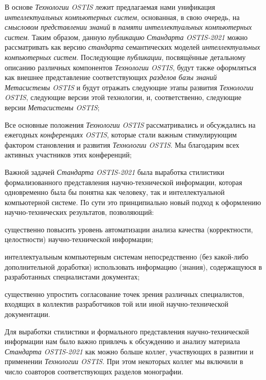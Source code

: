 \begin{SCn}
{\begin{scnitemize}
		\item В основе \textit{Технологии OSTIS} лежит предлагаемая нами унификация \textit{интеллектуальных компьютерных систем}, основанная, в свою очередь, на \textit{смысловом представлении знаний} в \textit{памяти интеллектуальных компьютерных систем}. Таким образом, данную \textit{публикацию} \textit{Стандарта OSTIS-2021} можно рассматривать как версию \textit{стандарта} семантических моделей \textit{интеллектуальных компьютерных систем}. Последующие \textit{публикации}, посвящённые детальному описанию различных компонентов \textit{Технологии OSTIS}, будут также оформляться как внешнее представление соответствующих \textit{разделов базы знаний} \textit{Метасистемы OSTIS} и будут отражать следующие этапы развития \textit{Технологии OSTIS}, следующие версии этой технологии, и, соответственно, следующие версии \textit{Метасистемы OSTIS};
		\item Все основные положения \textit{Технологии OSTIS} рассматривались и обсуждались на ежегодных \textit{конференциях OSTIS}, которые стали важным стимулирующим фактором становления и развития \textit{Технологии OSTIS}. Мы благодарим всех активных участников этих конференций;
		\item Важной задачей \textit{Стандарта OSTIS-2021} была выработка стилистики формализованного представления научно-технической информации, которая одновременно была бы понятна как человеку, так и интеллектуальной компьютерной системе. По сути это принципиально новый подход к оформлению научно-технических результатов, позволяющий:
		\begin{scnitemizeii}
			\item существенно повысить уровень автоматизации анализа качества (корректности, целостности) научно-технической информации;
			\item интеллектуальным компьютерным системам непосредственно (без какой-либо дополнительной {} доработки) использовать информацию (знания), содержащуюся в разработанных специалистами документах;
			\item существенно упростить согласование точек зрения различных специалистов, входящих в коллектив разработчиков той или иной научно-технической документации.
		\end{scnitemizeii}
		\item Для выработки стилистики и формального представления научно-технической информации нам было важно привлечь к обсуждению и анализу материала \textit{Стандарта OSTIS-2021} как можно больше коллег, участвующих в развитии и применении \textit{Технологии OSTIS}. При этом некоторых коллег мы включили в число соавторов соответствующих разделов монографии.

\end{scnitemize}}
\end{SCn}
